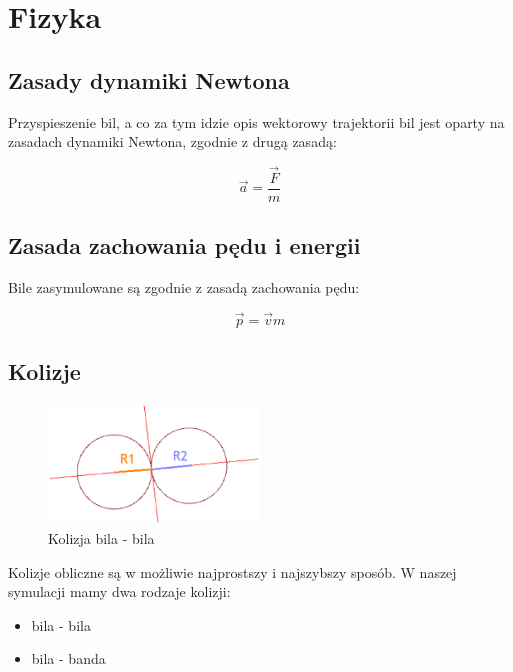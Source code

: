 \section{Fizyka}
\subsection{Zasady dynamiki Newtona}

Przyspieszenie bil, a co za tym idzie opis wektorowy trajektorii bil jest oparty na zasadach 
dynamiki Newtona, zgodnie z drugą zasadą:

\begin{equation}
\vec a = \frac{\vec F}{m}
\end{equation}

\subsection{Zasada zachowania pędu i energii}

Bile zasymulowane są zgodnie z zasadą zachowania pędu:

\begin{equation}
\vec p = \vec v {m}
\end{equation}

\subsection{Kolizje}

\begin{figure}[h]
  \centering
  \includegraphics[width=0.5\textwidth]{./img/bb_col.eps}
  \caption{Kolizja bila - bila}
  \label{fig:bbcol}
\end{figure}

Kolizje obliczne są w możliwie najprostszy i najszybszy sposób. W naszej symulacji mamy dwa rodzaje kolizji:
\begin{itemize}
 \item bila - bila
 \item bila - banda
\end{itemize}

